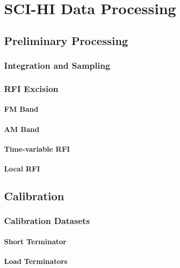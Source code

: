 \chapter{SCI-HI Data Processing}

\section{Preliminary Processing}

\subsection{Integration and Sampling}

\subsection{RFI Excision}

\subsubsection{FM Band}

\subsubsection{AM Band}

\subsubsection{Time-variable RFI}

\subsubsection{Local RFI}

\section{Calibration}

\subsection{Calibration Datasets}

\subsubsection{Short Terminator}

\subsubsection{Load Terminators}

